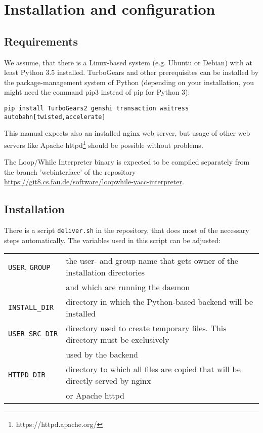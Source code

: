 \chapter{Installation and configuration}
\section{Requirements}
We assume, that there is a Linux-based system (e.g. Ubuntu or Debian) with at least Python 3.5 installed. TurboGears and other prerequisites can
be installed by the package-management system of Python (depending on your installation, you might need the command pip3 instead of pip for Python 3):

\begin{verbatim}
pip install TurboGears2 genshi transaction waitress autobahn[twisted,accelerate]
\end{verbatim}

This manual expects also an installed nginx web server, but usage of other web servers like Apache httpd\footnote{https://httpd.apache.org/}
should be possible without problems.

The Loop/While Interpreter binary is expected to be compiled separately from the branch
\mbox{'webinterface'} of the repository\\
\url{https://git8.cs.fau.de/software/loopwhile-yacc-interpreter}.


\section{Installation}
\label{section:installation}
There is a script \verb|deliver.sh| in the repository, that does most of the necessary
steps automatically. The variables used in this script can be adjusted:

\begin{tabular}{@{}l l}
\verb|USER|, \verb|GROUP| & the user- and group name that gets owner of the installation directories\\
                          & and which are running the daemon \\
\verb|INSTALL_DIR|        & directory in which the Python-based backend will be installed \\
\verb|USER_SRC_DIR|       & directory used to create temporary files. This directory must be exclusively\\
                          & used by the backend \\
\verb|HTTPD_DIR|          & directory to which all files are copied that will be directly served by nginx\\
                          & or Apache httpd\\
\end{tabular}

